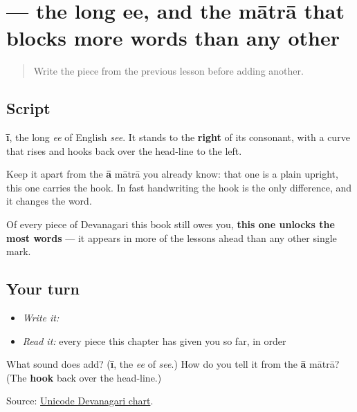 \section[\texorpdfstring{\hi{ी} (-ī)}{ी (-ī)}]{ — the long ee, and the mātrā that blocks more words than any other}

\label{lesson:HI-W12-ii-matra}



\begin{quote}
Write the piece from the previous lesson before adding another.
\end{quote}

\subsection*{Script}

\begin{quote}
\end{quote}

\textbf{ī}, the long \emph{ee} of English \emph{see}. It stands to the \textbf{right} of its consonant, with a curve that rises and hooks back over the head-line to the left.

Keep it apart from the \textbf{ā} mātrā you already know: that one is a plain upright, this one carries the hook. In fast handwriting the hook is the only difference, and it changes the word.

Of every piece of Devanagari this book still owes you, \textbf{this one unlocks the most words} — it appears in more of the lessons ahead than any other single mark.

\subsection*{Your turn}
\begin{itemize}
\raggedright
  \item \emph{Write it:} 
  \item \emph{Read it:} every piece this chapter has given you so far, in order
\end{itemize}

\begin{tcolorbox}[breakable,colback=teal!4,colframe=teal!35!black,title={Before you move on}]
What sound does \textbf{} add? (\textbf{ī}, the \emph{ee} of \emph{see}.) How do you tell it from the \textbf{ā} mātrā? (The \textbf{hook} back over the head-line.)

Source: \href{https://www.unicode.org/charts/PDF/U0900.pdf}{Unicode Devanagari chart}.
\end{tcolorbox}
